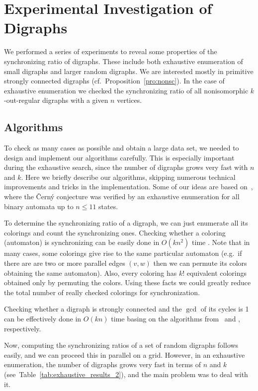 \documentclass[runningheads]{llncs}
\begin{document}
\section{Experimental Investigation of Digraphs}

We performed a series of experiments to reveal some properties of the synchronizing ratio of digraphs. These include both exhaustive enumeration of small digraphs and larger random digraphs.
We are interested mostly in primitive strongly connected digraphs (cf.~Proposition~\ref{pro:nonsc}).
In the case of exhaustive enumeration we checked the synchronizing ratio of all nonisomorphic $k$-out-regular digraphs with a given $n$ vertices.

\subsection{Algorithms}

To check as many cases as possible and obtain a large data set, we needed to design and implement our algorithms carefully.
This is especially important during the exhaustive search, since the number of digraphs grows very fast with $n$ and $k$.
Here we briefly describe our algorithms, skipping numerous technical improvements and tricks in the implementation.
Some of our ideas are based on~\cite{KS2013GeneratingSmallAutomata}, where the \v{C}ern\'{y} conjecture was verified by an exhaustive enumeration for all binary automata up to $n\le 11$ states.

To determine the synchronizing ratio of a digraph, we can just enumerate all its colorings and count the synchronizing ones.
Checking whether a coloring (automaton) is synchronizing can be easily done in $O(kn^2)$ time \cite{Cerny1964,Ep1990}.
Note that in many cases, some colorings give rise to the same particular automaton (e.g.~if there are are two or more parallel edges $(v,w)$ then we can permute its colors obtaining the same automaton).
Also, every coloring has $k!$ equivalent colorings obtained only by permuting the colors. Using these facts we could greatly reduce the total number of really checked colorings for synchronization.

Checking whether a digraph is strongly connected and the $\gcd$ of its cycles is 1 can be effectively done in $O(kn)$ time basing on the algorithms from~\cite{Tarjan1972} and \cite{JS1996GraphTheoreticAnalysisOfMarkovChains}, respectively.

Now, computing the synchronizing ratios of a set of random digraphs follows easily, and we can proceed this in parallel on a grid.
However, in an exhaustive enumeration, the number of digraphs grows very fast in terms of $n$ and $k$ (see~Table~\ref{tab:exhaustive_results_2}), and the main problem was to deal with it.
\end{document}
